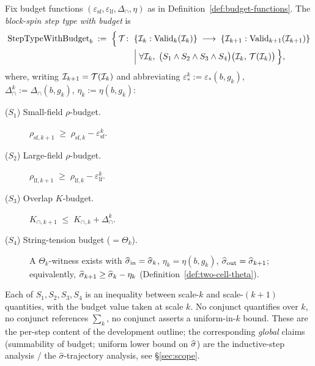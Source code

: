 \begin{definition}
\label{def:step-type-with-budget}
Fix budget functions $(\varepsilon_{\mathrm{sf}}, \varepsilon_{\mathrm{lf}}, \Delta_{\cap}, \eta)$ as in Definition~\ref{def:budget-functions}.  The \emph{block-spin step type with budget} is
\begin{align}
  \label{eq:step-type-with-budget}
  \mathrm{StepTypeWithBudget}_b
  \;:=\;
  \Bigl\{\,
    \mathcal{T} \colon\;
      &\{\mathcal{I}_k : \mathrm{Valid}_k(\mathcal{I}_k)\}
      \;\longrightarrow\;
      \{\mathcal{I}_{k+1} : \mathrm{Valid}_{k+1}(\mathcal{I}_{k+1})\}
    \notag\\[-1pt]
    &\Big|\;
    \forall \mathcal{I}_k, \;\bigl(S_1 \wedge S_2 \wedge S_3 \wedge S_4\bigr)\bigl(\mathcal{I}_k,\, \mathcal{T}(\mathcal{I}_k)\bigr)
  \,\Bigr\},
\end{align}
where, writing $\mathcal{I}_{k+1} = \mathcal{T}(\mathcal{I}_k)$ and abbreviating $\varepsilon_*^k := \varepsilon_*(b, g_k)$, $\Delta_{\cap}^k := \Delta_{\cap}(b, g_k)$, $\eta_k := \eta(b, g_k)$:
\begin{description}
  \item[\textnormal{($S_1$) Small-field $\rho$-budget.}] $\rho_{\mathrm{sf}, k+1} \;\ge\; \rho_{\mathrm{sf}, k} - \varepsilon_{\mathrm{sf}}^k$.
  \item[\textnormal{($S_2$) Large-field $\rho$-budget.}] $\rho_{\mathrm{lf}, k+1} \;\ge\; \rho_{\mathrm{lf}, k} - \varepsilon_{\mathrm{lf}}^k$.
  \item[\textnormal{($S_3$) Overlap $K$-budget.}] $K_{\cap, k+1} \;\le\; K_{\cap, k} + \Delta_{\cap}^k$.
  \item[\textnormal{($S_4$) String-tension budget ($= \Theta_k$).}] A $\Theta_k$-witness exists with $\widehat{\sigma}_{\mathrm{in}} = \widehat{\sigma}_k$, $\eta_k = \eta(b, g_k)$, $\widehat{\sigma}_{\mathrm{out}} = \widehat{\sigma}_{k+1}$; equivalently, $\widehat{\sigma}_{k+1} \ge \widehat{\sigma}_k - \eta_k$ (Definition~\ref{def:two-cell-theta}).
\end{description}
\end{definition}

\begin{remark}
\label{rem:per-step}
Each of $S_1, S_2, S_3, S_4$ is an inequality between scale-$k$ and scale-$(k+1)$ quantities, with the budget value taken at scale $k$.  No conjunct quantifies over $k$, no conjunct references $\sum_k$, no conjunct asserts a uniform-in-$k$ bound.  These are the per-step content of the development outline; the corresponding \emph{global} claims (summability of budget; uniform lower bound on $\widehat{\sigma}$) are the inductive-step analysis / the $\widehat\sigma$-trajectory analysis, see \S\ref{sec:scope}.
\end{remark}

